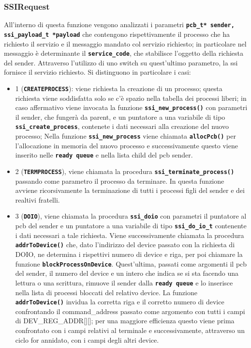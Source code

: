 \documentclass{article}
\begin{document}
\subsubsection{SSIRequest}
All'interno di questa funzione vengono analizzati i parametri \texttt{\textbf{pcb\_t* sender, ssi\_payload\_t *payload}} che contengono rispettivamente il processo che ha richiesto il servizio e il messaggio mandato col servizio richiesto; in particolare nel messaggio è determinante il \texttt{\textbf{service\_code}}, che stabilisce l'oggetto della richiesta del sender. Attraverso l'utilizzo di uno switch su quest'ultimo parametro, la ssi fornisce il servizio richiesto.
Si distinguono in particolare i casi:
\begin{itemize}
	\item 1 (\texttt{\textbf{CREATEPROCESS}}): viene richiesta la creazione di un processo; questa richiesta viene soddisfatta solo se c'è spazio nella tabella dei processi liberi; in caso affermativo viene invocata la funzione \texttt{\textbf{ssi\_new\_process()}} con parametri il sender, che fungerà da parent, e un puntatore a una variabile di tipo \texttt{\textbf{ssi\_create\_process}}, contenete i dati necessari alla creazione del nuovo processo; 
   Nella funzione \texttt{\textbf{ssi\_new\_process}} viene chiamata \texttt{\textbf{allocPcb()}} per l'allocazione in memoria del nuovo processo e successivamente questo viene inserito nelle \texttt{\textbf{ready queue}} e nella lista child del pcb sender.
   

    \item 2 (\texttt{\textbf{TERMPROCESS}}), viene chiamata la procedura \texttt{\textbf{ssi\_terminate\_process()}} passando come parametro il processo da terminare.
    In questa funzione avviene ricorsivamente la terminazione di tutti i processi figli del sender e dei realtivi fratelli.

    \item 3 (\texttt{\textbf{DOIO}}), viene chiamata la procedura \texttt{\textbf{ssi\_doio}} con parametri il puntatore al pcb del sender e un puntatore a una variabile di tipo \texttt{\textbf{ssi\_do\_io\_t}} contenente i dati necessari a tale richiesta.
    Viene successivamente chiamata la procedura \texttt{\textbf{addrToDevice()}} che, dato l'indirizzo del device passato con la richiesta di DOIO, ne determina i rispettivi numero di device e riga, per poi chiamare la funzione \texttt{\textbf{blockProcessOnDevice}}.
    Quest'ultima, passati come argomenti il pcb del sender, il numero del device e un intero che indica se si sta facendo una lettura o una scrittura, rimuove il sender dalla \texttt{\textbf{ready queue}} e lo inserisce nella lista di processi bloccati del relativo device.
    La funzione \texttt{\textbf{addrToDevice()}} invidua la corretta riga e il corretto numero di device confrontando il command\_address passato come argomento con tutti i campi di DEV\_REG\_ADDR[][]; per una maggiore efficienza questo viene prima confrontato con i campi relativi al terminale e successivamente, attraverso un ciclo for annidato, con i campi degli altri device.



\end{itemize}
\end{document}
